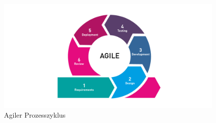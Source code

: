 \begin{figure}[htb]
	\centering
	\includegraphics[width=\textwidth]{img/agile_cycle.png}
	\caption[Agiler Prozesszyklus Quelle: ]{Agiler Prozesszyklus}
	\label{fig:klh}
\end{figure}
